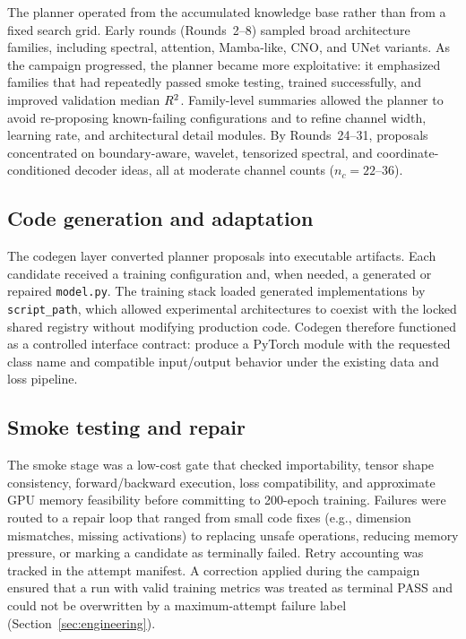 ﻿\documentclass[preprint,12pt,authoryear]{elsarticle}
\newcommand{\rTwo}{R\textsuperscript{2}}
\begin{document}
The planner operated from the accumulated knowledge base rather than from a fixed search grid.
Early rounds (Rounds~2--8) sampled broad architecture families, including spectral, attention, Mamba-like, CNO, and UNet variants.
As the campaign progressed, the planner became more exploitative: it emphasized families that had repeatedly passed smoke testing, trained successfully, and improved validation median $\rTwo{}$.
Family-level summaries allowed the planner to avoid re-proposing known-failing configurations and to refine channel width, learning rate, and architectural detail modules.
By Rounds~24--31, proposals concentrated on boundary-aware, wavelet, tensorized spectral, and coordinate-conditioned decoder ideas, all at moderate channel counts ($n_c = 22$--$36$).

\subsection{Code generation and adaptation}
\label{sec:codegen}

The codegen layer converted planner proposals into executable artifacts.
Each candidate received a training configuration and, when needed, a generated or repaired \texttt{model.py}.
The training stack loaded generated implementations by \texttt{script\_path}, which allowed experimental architectures to coexist with the locked shared registry without modifying production code.
Codegen therefore functioned as a controlled interface contract: produce a PyTorch module with the requested class name and compatible input/output behavior under the existing data and loss pipeline.

\subsection{Smoke testing and repair}
\label{sec:smoke}

The smoke stage was a low-cost gate that checked importability, tensor shape consistency, forward/backward execution, loss compatibility, and approximate GPU memory feasibility before committing to 200-epoch training.
Failures were routed to a repair loop that ranged from small code fixes (e.g., dimension mismatches, missing activations) to replacing unsafe operations, reducing memory pressure, or marking a candidate as terminally failed.
Retry accounting was tracked in the attempt manifest.
A correction applied during the campaign ensured that a run with valid training metrics was treated as terminal PASS and could not be overwritten by a maximum-attempt failure label (Section~\ref{sec:engineering}).
\end{document}
